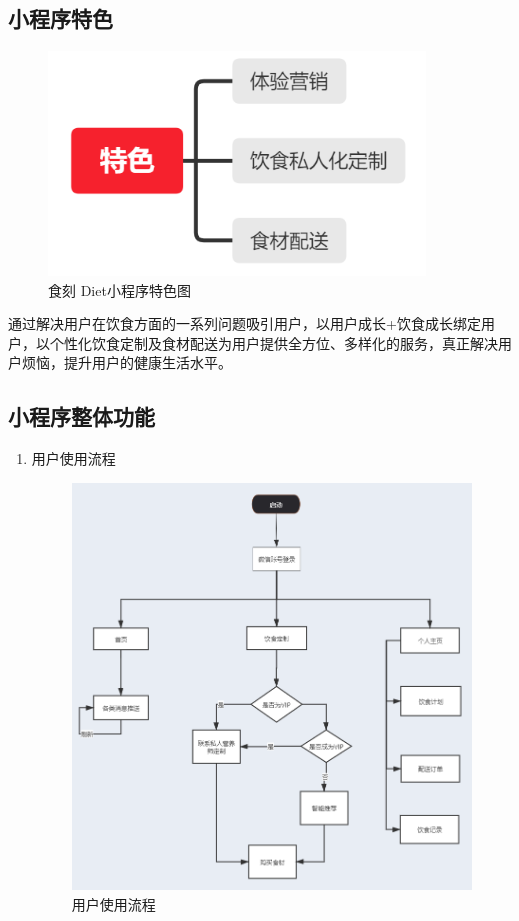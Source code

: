 \documentclass[UTF8,12pt]{ctexart}
\numberwithin{figure}{section}%
\begin{document}
\begin{spacing}{2}
\subsection{小程序特色}

\begin{figure}[!htb]
	\centering
	\includegraphics[width=10cm]{fig/18}
	\caption{食刻 Diet小程序特色图}
\end{figure}

通过解决用户在饮食方面的一系列问题吸引用户，以用户成长+饮食成长绑定用户，以个性化饮食定制及食材配送为用户提供全方位、多样化的服务，真正解决用户烦恼，提升用户的健康生活水平。

\newpage
\subsection{小程序整体功能}
\begin{enumerate}
	
	\item 用户使用流程
	\begin{figure}[!htb]
		\centering
		\includegraphics[width=14cm]{fig/19}
		\caption{用户使用流程}
	\end{figure}
	

\end{enumerate}
\end{spacing}
\end{document}
